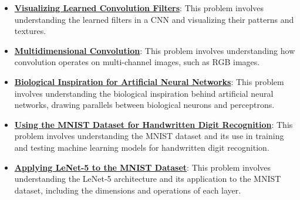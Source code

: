 \documentclass{article}%
\begin{document}
\begin{itemize}[leftmargin=*]
\item \href{https://purdue.brightspace.com/d2l/common/assets/pdfjs-d2l-dist/1.0.14-legacy/web/viewer.html?file=\%2Fcontent\%2Fenforced\%2F1095467-wl.202510.CS.24300.001\%2F09L1-cnn.pdf\%3Fou\%3D1095467\&lang=en-us\&container=d2l-fileviewer-rendered-pdf\&fullscreen=d2l-fileviewer-rendered-pdf-dialog\&height=667#page=18}{\textbf{Visualizing Learned Convolution Filters}}: This problem involves understanding the learned filters in a CNN and visualizing their patterns and textures.%
\item \href{https://purdue.brightspace.com/d2l/common/assets/pdfjs-d2l-dist/1.0.14-legacy/web/viewer.html?file=\%2Fcontent\%2Fenforced\%2F1095467-wl.202510.CS.24300.001\%2F09L1-cnn.pdf\%3Fou\%3D1095467\&lang=en-us\&container=d2l-fileviewer-rendered-pdf\&fullscreen=d2l-fileviewer-rendered-pdf-dialog\&height=667#page=19}{\textbf{Multidimensional Convolution}}: This problem involves understanding how convolution operates on multi-channel images, such as RGB images.%
\item \href{https://purdue.brightspace.com/d2l/common/assets/pdfjs-d2l-dist/1.0.14-legacy/web/viewer.html?file=\%2Fcontent\%2Fenforced\%2F1095467-wl.202510.CS.24300.001\%2F09L1-cnn.pdf\%3Fou\%3D1095467\&lang=en-us\&container=d2l-fileviewer-rendered-pdf\&fullscreen=d2l-fileviewer-rendered-pdf-dialog\&height=667#page=20}{\textbf{Biological Inspiration for Artificial Neural Networks}}: This problem involves understanding the biological inspiration behind artificial neural networks, drawing parallels between biological neurons and perceptrons.%
\item \href{https://purdue.brightspace.com/d2l/common/assets/pdfjs-d2l-dist/1.0.14-legacy/web/viewer.html?file=\%2Fcontent\%2Fenforced\%2F1095467-wl.202510.CS.24300.001\%2F09L1-cnn.pdf\%3Fou\%3D1095467\&lang=en-us\&container=d2l-fileviewer-rendered-pdf\&fullscreen=d2l-fileviewer-rendered-pdf-dialog\&height=667#page=21}{\textbf{Using the MNIST Dataset for Handwritten Digit Recognition}}: This problem involves understanding the MNIST dataset and its use in training and testing machine learning models for handwritten digit recognition.%
\item \href{https://purdue.brightspace.com/d2l/common/assets/pdfjs-d2l-dist/1.0.14-legacy/web/viewer.html?file=\%2Fcontent\%2Fenforced\%2F1095467-wl.202510.CS.24300.001\%2F09L1-cnn.pdf\%3Fou\%3D1095467\&lang=en-us\&container=d2l-fileviewer-rendered-pdf\&fullscreen=d2l-fileviewer-rendered-pdf-dialog\&height=667#page=22}{\textbf{Applying LeNet-5 to the MNIST Dataset}}: This problem involves understanding the LeNet-5 architecture and its application to the MNIST dataset, including the dimensions and operations of each layer.%

\end{itemize}
\end{document}
